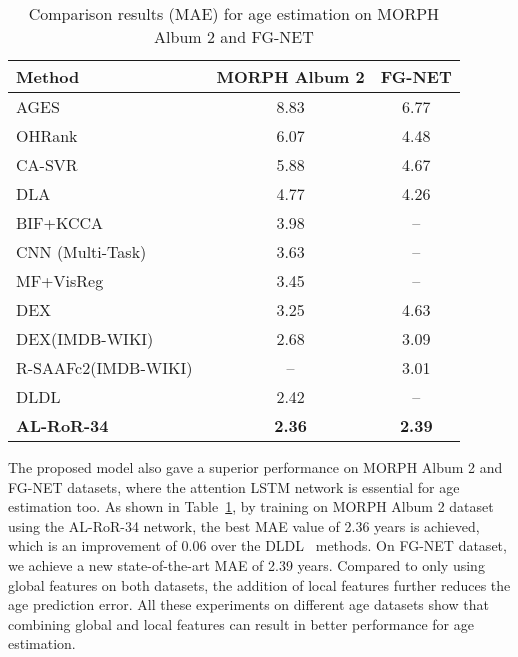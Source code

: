 \documentclass[journal]{IEEEtran}
\begin{document}
\begin{table}[!t]
\renewcommand{\arraystretch}{1.3}
\caption{Comparison results (MAE) for age estimation on MORPH Album 2 and FG-NET}
\label{tab:morph-fgnet}
\centering
\begin{tabular}{|l|c|c|}
\hline
Method                                        &MORPH Album 2    &FG-NET  \\ \hline\hline
AGES~\cite{ref-23}                            &8.83             &6.77    \\\hline
OHRank~\cite{ref-24}                          &6.07             &4.48 \\\hline
CA-SVR~\cite{ref-26}                          &5.88             &4.67 \\\hline
DLA~\cite{ref-25}                             &4.77             &4.26 \\\hline
BIF+KCCA~\cite{ref-28}                        &3.98             &-- \\\hline
CNN (Multi-Task)~\cite{ref-29}                &3.63             &-- \\\hline
MF+VisReg~\cite{ref-30}                       &3.45             &-- \\\hline
DEX~\cite{ref-19}                             &3.25             &4.63 \\\hline
DEX(IMDB-WIKI)~\cite{ref-19}                  &2.68             &3.09 \\\hline
R-SAAFc2(IMDB-WIKI)~\cite{ref-21}             &--               &3.01 \\\hline
DLDL~\cite{ref-32}                            &2.42             &-- \\\hline
\textbf{AL-RoR-34}                                     &\textbf{2.36}             &\textbf{2.39} \\\hline
\end{tabular}
\end{table}
The proposed model also gave a superior performance on MORPH Album 2 and FG-NET datasets, where the attention LSTM network is essential for age estimation too. As shown in Table~\ref{tab:morph-fgnet}, by training on MORPH Album 2 dataset using the AL-RoR-34 network, the best MAE value of 2.36 years is achieved, which is an improvement of 0.06 over the DLDL~\cite{ref-32} methods. On FG-NET dataset, we achieve a new state-of-the-art MAE of 2.39 years. Compared to only using global features on both datasets, the addition of local features further reduces the age prediction error. All these experiments on different age datasets show that combining global and local features can result in better performance for age estimation.
\end{document}
